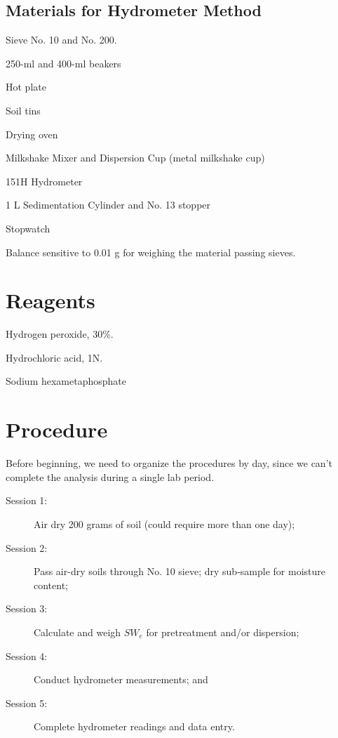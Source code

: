 \documentclass{tufte-handout}
\newenvironment{enumerate*}%
  {\begin{enumerate}%
    \setlength{\itemsep}{0pt}%
    \setlength{\parskip}{0pt}}%
  {\end{enumerate}}
\begin{document}
\subsection{Materials for Hydrometer Method}
\begin{enumerate*}
	\item Sieve No. 10 and No. 200.
	\item 250-ml and 400-ml beakers
	\item Hot plate
	\item Soil tins
	\item Drying oven
	\item Milkshake Mixer and Dispersion Cup (metal milkshake cup)	
	\item 151H Hydrometer
	\item 1 L Sedimentation Cylinder and No. 13 stopper 
	\item Stopwatch
	\item Balance sensitive to 0.01 g for weighing the material passing sieves.
\end{enumerate*}

\section{Reagents}
\begin{enumerate*}
	\item Hydrogen peroxide, 30\%.
	\item Hydrochloric acid, 1N.
	\item Sodium hexametaphosphate
\end{enumerate*}

\section{Procedure}

Before beginning, we need to organize the procedures by day, since we can't complete the analysis during a single lab period.

\begin{description}
	\item[Session 1:] Air dry 200 grams of soil (could require more than one day);
	\item[Session 2:] Pass air-dry soils through No. 10 sieve; dry sub-sample for moisture content; 
	\item[Session 3:] Calculate and weigh $SW_e$ for pretreatment and/or dispersion; 
	\item[Session 4:] Conduct hydrometer measurements; and
	\item[Session 5:] Complete hydrometer readings and data entry.
\end{description}
\end{document}
